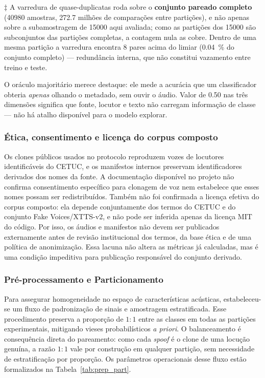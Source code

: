 \documentclass[12pt,a4paper]{article}
\begin{document}
\begin{table}[H]
	\vspace{2pt}
	{\footnotesize $\ddagger$ A varredura de quase-duplicatas roda sobre o
		\textbf{conjunto pareado completo} (\num{40980} amostras,
		\num{272,7} milhões de comparações entre partições), e não apenas sobre a
		subamostragem de \num{15000} aqui avaliada; como as partições dos
		\num{15000} são subconjuntos das partições completas, a contagem nula as cobre.
		Dentro de uma mesma partição a varredura encontra \num{8} pares acima do
		limiar (\SI{0,04}{\percent} do conjunto completo) --- redundância interna, que
		não constitui vazamento entre treino e teste.}
\end{table}

O oráculo majoritário merece destaque: ele mede a acurácia que um classificador
obteria \emph{apenas} olhando o metadado, sem ouvir o áudio. Valor de
\num{0,50} nas três dimensões significa que fonte, locutor e texto não carregam
informação de classe --- não há atalho disponível para o modelo explorar.

\subsubsection{Ética, consentimento e licença do corpus composto}

Os clones públicos usados no protocolo reproduzem vozes de locutores
identificáveis do CETUC, e os manifestos internos preservam identificadores
derivados dos nomes da fonte. A documentação disponível no projeto não confirma
consentimento específico para clonagem de voz nem estabelece que esses nomes
possam ser redistribuídos. Também não foi confirmada a licença efetiva do corpus
composto: ela depende conjuntamente dos termos do CETUC e do conjunto Fake
Voices/XTTS-v2, e não pode ser inferida apenas da licença MIT do código. Por
isso, os áudios e manifestos não devem ser publicados externamente antes de
revisão institucional dos termos, da base ética e de uma política de
anonimização. Essa lacuna não altera as métricas já calculadas, mas é uma
condição impeditiva para publicação responsável do conjunto derivado.

\subsubsection{Pré-processamento e Particionamento}

Para assegurar homogeneidade no espaço de características acústicas,
estabeleceu-se um fluxo de padronização de sinais e amostragem estratificada.
Esse procedimento preserva a proporção de $1:1$ entre as classes em todas as
partições experimentais, mitigando vieses probabilísticos \textit{a priori}. O
balanceamento é consequência direta do pareamento: como cada \textit{spoof} é o
clone de uma locução genuína, a razão $1:1$ vale por construção em qualquer
partição, sem necessidade de estratificação por proporção. Os parâmetros
operacionais desse fluxo estão formalizados na Tabela~\ref{tab:prep_part}.
\end{document}
